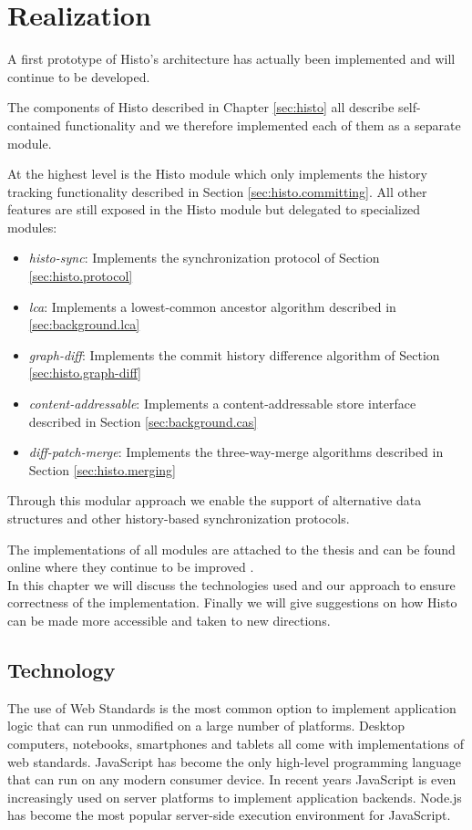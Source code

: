 
\chapter{Realization}
\label{sec:realization}
A first prototype of Histo's architecture has actually been implemented and will continue to be developed.

The components of Histo described in Chapter \ref{sec:histo} all describe self-contained functionality and we therefore implemented each of them as a separate module.

At the highest level is the Histo module which only implements the history tracking functionality described in Section \ref{sec:histo.committing}.
All other features are still exposed in the Histo module but delegated to specialized modules:

\begin{itemize}
\item \emph{histo-sync}: Implements the synchronization protocol of Section \ref{sec:histo.protocol}
\item \emph{lca}: Implements a lowest-common ancestor algorithm described in \ref{sec:background.lca}
\item \emph{graph-diff}: Implements the commit history difference algorithm of Section \ref{sec:histo.graph-diff}
\item \emph{content-addressable}: Implements a content-addressable store interface described in Section \ref{sec:background.cas}
\item \emph{diff-patch-merge}: Implements the three-way-merge algorithms described in Section \ref{sec:histo.merging}
\end{itemize}

Through this modular approach we enable the support of alternative data structures and other history-based synchronization protocols.

The implementations of all modules are attached to the thesis and can be found online where they continue to be improved \cite{histo-source}.\\

In this chapter we will discuss the technologies used and our approach to ensure correctness of the implementation.
Finally we will give suggestions on how Histo can be made more accessible and taken to new directions.

\section{Technology}
\label{sec:realization.technology}
The use of Web Standards is the most common option to implement application logic that can run unmodified on a large number of platforms.
Desktop computers, notebooks, smartphones and tablets all come with implementations of web standards.
JavaScript has become the only high-level programming language that can run on any modern consumer device.
In recent years JavaScript is even increasingly used on server platforms to implement application backends.
Node.js has become the most popular server-side execution environment for JavaScript.\\

